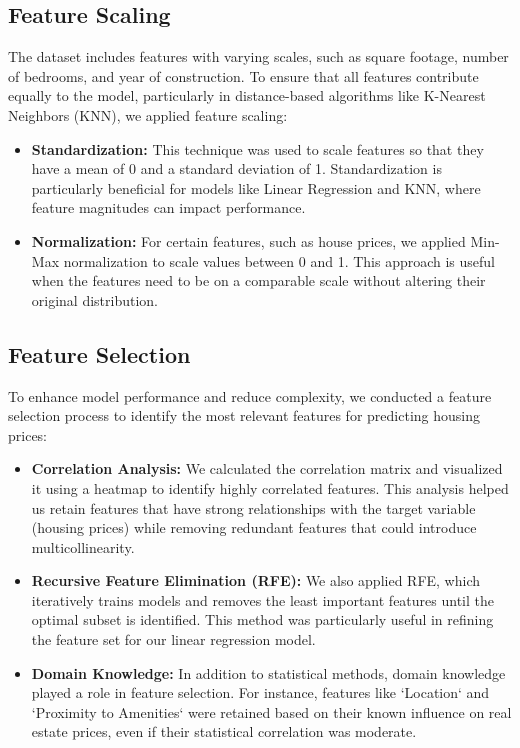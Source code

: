 \documentclass[10pt,conference,compsoc]{IEEEtran}
\begin{document}
{\subsection{Feature Scaling}
The dataset includes features with varying scales, such as square footage, number of bedrooms, and year of construction. To ensure that all features contribute equally to the model, particularly in distance-based algorithms like K-Nearest Neighbors (KNN), we applied feature scaling:
\begin{itemize}
    \item \textbf{Standardization:} This technique was used to scale features so that they have a mean of 0 and a standard deviation of 1. Standardization is particularly beneficial for models like Linear Regression and KNN, where feature magnitudes can impact performance.
    \item \textbf{Normalization:} For certain features, such as house prices, we applied Min-Max normalization to scale values between 0 and 1. This approach is useful when the features need to be on a comparable scale without altering their original distribution.
\end{itemize}

\subsection{Feature Selection}
To enhance model performance and reduce complexity, we conducted a feature selection process to identify the most relevant features for predicting housing prices:
\begin{itemize}
    \item \textbf{Correlation Analysis:} We calculated the correlation matrix and visualized it using a heatmap to identify highly correlated features. This analysis helped us retain features that have strong relationships with the target variable (housing prices) while removing redundant features that could introduce multicollinearity.
    \item \textbf{Recursive Feature Elimination (RFE):} We also applied RFE, which iteratively trains models and removes the least important features until the optimal subset is identified. This method was particularly useful in refining the feature set for our linear regression model.
    \item \textbf{Domain Knowledge:} In addition to statistical methods, domain knowledge played a role in feature selection. For instance, features like `Location` and `Proximity to Amenities` were retained based on their known influence on real estate prices, even if their statistical correlation was moderate.
\end{itemize}

}
\end{document}
